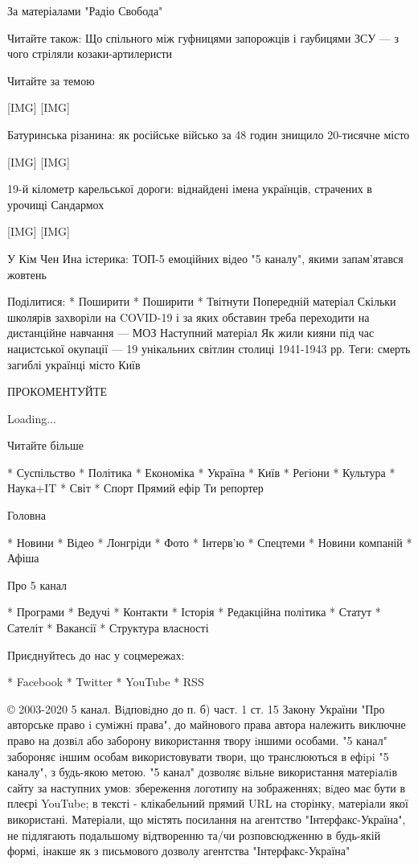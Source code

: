 За матеріалами "Радіо Свобода"

Читайте також: Що спільного між гуфницями запорожців і гаубицями ЗСУ --- з
чого стріляли козаки-артилеристи

Читайте за темою

[IMG] [IMG]

Батуринська різанина: як російське військо за 48 годин знищило 20-тисячне
місто

[IMG] [IMG]

19-й кілометр карельської дороги: віднайдені імена українців, страчених в
урочищі Сандармох

[IMG] [IMG]

У Кім Чен Ина істерика: ТОП-5 емоційних відео "5 каналу", якими запам'ятався
жовтень

Поділитися:
* Поширити
* Поширити
* Твітнути
Попередній матеріал
Скільки школярів захворіли на COVID-19 і за яких обставин треба переходити
на дистанційне навчання --- МОЗ
Наступний матеріал
Як жили кияни під час нацистської окупації --- 19 унікальних світлин столиці
1941-1943 рр.
Теги:
смерть загиблі українці місто Київ

ПРОКОМЕНТУЙТЕ

Loading...

Читайте більше

* Суспільство
* Політика
* Економіка
* Україна
* Київ
* Регіони
* Культура
* Наука+IT
* Світ
* Спорт
Прямий ефір Ти репортер

Головна

* Новини
* Відео
* Лонгріди
* Фото
* Інтерв'ю
* Спецтеми
* Новини компаній
* Афіша

Про 5 канал

* Програми
* Ведучі
* Контакти
* Історія
* Редакційна політика
* Статут
* Сателіт
* Вакансії
* Структура власності

Приєднуйтесь до нас у соцмережах:

* Facebook
* Twitter
* YouTube
* RSS

© 2003-2020 5 канал. Вiдповiдно до п. б) част. 1 ст. 15 Закону України
"Про авторське право i сумiжнi права", до майнового права автора належить
виключне право на дозвiл або заборону використання твору iншими особами.
"5 канал" забороняє iншим особам використовувати твори, що транслюються в
ефipi "5 каналу", з будь-якою метою. "5 канал" дозволяє вiльне
використання матерiалiв сайту за наступних умов: збереження логотипу на
зображеннях; вiдео має бути в плеєрі YouTube; в тексті - клікабельний
прямий URL на сторінку, матеріали якої використані. Матеріали, що містять
посилання на агентство "Інтерфакс-Україна", не підлягають подальшому
відтворенню та/чи розповсюдженню в будь-якій формі, інакше як з письмового
дозволу агентства "Інтерфакс-Україна"
